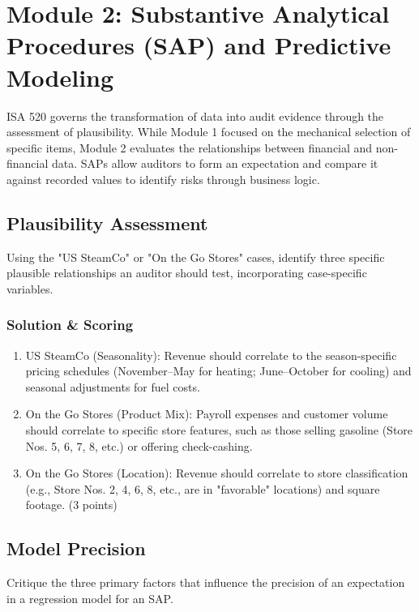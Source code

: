 \documentclass[12pt,a4paper]{memoir}
\begin{document}
\section{Module 2: Substantive Analytical Procedures (SAP) and Predictive Modeling}

ISA 520 governs the transformation of data into audit evidence through the assessment of plausibility. While Module 1 focused on the mechanical selection of specific items, Module 2 evaluates the relationships between financial and non-financial data. SAPs allow auditors to form an expectation and compare it against recorded values to identify risks through business logic.

\subsection{Plausibility Assessment}

Using the "US SteamCo" or "On the Go Stores" cases, identify three specific plausible relationships an auditor should test, incorporating case-specific variables.

\subsubsection{Solution \& Scoring}
\begin{enumerate}
\item US SteamCo (Seasonality): Revenue should correlate to the season-specific pricing schedules (November--May for heating; June--October for cooling) and seasonal adjustments for fuel costs.
\item On the Go Stores (Product Mix): Payroll expenses and customer volume should correlate to specific store features, such as those selling gasoline (Store Nos. 5, 6, 7, 8, etc.) or offering check-cashing.
\item On the Go Stores (Location): Revenue should correlate to store classification (e.g., Store Nos. 2, 4, 6, 8, etc., are in "favorable" locations) and square footage. (3 points)
\end{enumerate}

\subsection{Model Precision}

Critique the three primary factors that influence the precision of an expectation in a regression model for an SAP.
\end{document}

